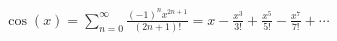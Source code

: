 \documentclass[preview]{standalone}
\begin{document}
\begin{align*}
\cos(x) = \sum_{n=0}^{\infty} \frac{(-1)^n x^{2n+1}}{(2n+1)!} = x-\frac{x^3}{3!}+\frac{x^5}{5!}-\frac{x^7}{7!}+\cdots
\end{align*}
\end{document}
